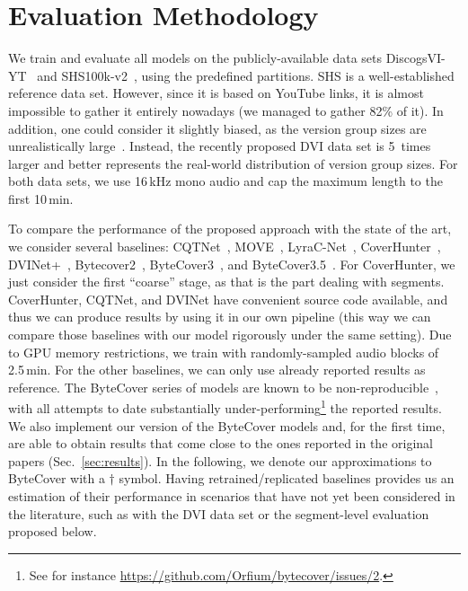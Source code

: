 \section{Evaluation Methodology}
\label{sec:eval}

We train and evaluate all models on the publicly-available data sets DiscogsVI-YT~\citep[DVI;][]{araz_discogs-vi_2024} and SHS100k-v2~\citep[SHS;][]{yu_learning_2020}, using the predefined partitions. SHS is a well-established reference data set. However, since it is based on YouTube links, it is almost impossible to gather it entirely nowadays (we managed to gather 82\% of it). In addition, one could consider it slightly biased, as the version group sizes are unrealistically large~\citep[cf.][]{doras_prototypical_2020, araz_discogs-vi_2024}. Instead, the recently proposed DVI data set is 5~times larger and better represents the real-world distribution of version group sizes. For both data sets, we use 16\,kHz mono audio and cap the maximum length to the first 10\,min. 

To compare the performance of the proposed approach with the state of the art, we consider several baselines: CQTNet~\cite{yu_learning_2020}, MOVE~\cite{yesiler_accurate_2020}, LyraC-Net~\cite{hu_wideresnet_2022}, CoverHunter~\cite{liu_coverhunter_2023}, DVINet+~\cite{araz_discogs-vinet-mirex_2024}, Bytecover2~\cite{du_bytecover2_2022}, ByteCover3~\cite{du_bytecover3_2023}, and ByteCover3.5~\cite{du_x-cover_2024}. For CoverHunter, we just consider the first ``coarse'' stage, as that is the part dealing with segments. CoverHunter, CQTNet, and DVINet have convenient source code available, and thus we can produce results by using it in our own pipeline (this way we can compare those baselines with our model rigorously under the same setting). Due to GPU memory restrictions, we train with randomly-sampled audio blocks of 2.5\,min. For the other baselines, we can only use already reported results as reference. 
The ByteCover series of models are known to be non-reproducible~\cite{ohanlon_detecting_2021, hu_wideresnet_2022}, with all attempts to date substantially under-performing\footnote{See for instance \url{https://github.com/Orfium/bytecover/issues/2}.} the reported results. We also implement our version of the ByteCover models and, for the first time, are able to obtain results that come close to the ones reported in the original papers (Sec.~\ref{sec:results}). In the following, we denote our approximations to ByteCover with a $\dag$ symbol. Having retrained/replicated baselines provides us an estimation of their performance in scenarios that have not yet been considered in the literature, such as with the DVI data set or the segment-level evaluation proposed below. %

